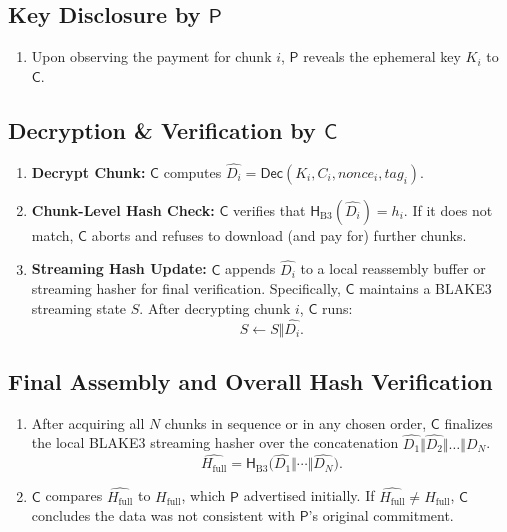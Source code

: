 \documentclass[11pt]{article}
\begin{document}
\subsection{Key Disclosure by $\mathsf{P}$}
\begin{enumerate}[{\bf P2.}]
    \item Upon observing the payment for chunk $i$, $\mathsf{P}$ reveals the ephemeral key $K_i$ to $\mathsf{C}$.
\end{enumerate}

\subsection{Decryption \& Verification by $\mathsf{C}$}
\begin{enumerate}[{\bf C2.}]
    \item \textbf{Decrypt Chunk:} $\mathsf{C}$ computes $\widehat{D_i} = \mathsf{Dec}(K_i, C_i, \mathit{nonce}_i, \mathit{tag}_i)$. 
    \item \textbf{Chunk-Level Hash Check:} $\mathsf{C}$ verifies that $\mathsf{H}_{\mathrm{B3}}(\widehat{D_i}) = h_i$. 
    If it does not match, $\mathsf{C}$ aborts and refuses to download (and pay for) further chunks.
    \item \textbf{Streaming Hash Update:} $\mathsf{C}$ appends $\widehat{D_i}$ to a local reassembly buffer or streaming hasher for final verification. 
    Specifically, $\mathsf{C}$ maintains a BLAKE3 streaming state $S$. 
    After decrypting chunk $i$, $\mathsf{C}$ runs:
    \[
       S \leftarrow S \Vert \widehat{D_i}.
    \]
\end{enumerate}

\subsection{Final Assembly and Overall Hash Verification}
\begin{enumerate}[{\bf C3.}]
    \item After acquiring all $N$ chunks in sequence or in any chosen order, $\mathsf{C}$ finalizes the local BLAKE3 streaming hasher over the concatenation $\widehat{D_1} \Vert \widehat{D_2} \Vert \dots \Vert \widehat{D_N}$. 
    \[
       \widehat{H_{\mathrm{full}}} = \mathsf{H}_{\mathrm{B3}}\bigl(\widehat{D_1} \Vert \cdots \Vert \widehat{D_N}\bigr).
    \]
    \item $\mathsf{C}$ compares $\widehat{H_{\mathrm{full}}}$ to $H_{\mathrm{full}}$, which $\mathsf{P}$ advertised initially. 
    If $\widehat{H_{\mathrm{full}}} \neq H_{\mathrm{full}}$, $\mathsf{C}$ concludes the data was not consistent with $\mathsf{P}$'s original commitment.
\end{enumerate}
\end{document}
